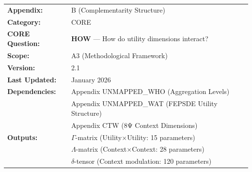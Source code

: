%
% 
%
%
%


\begin{tcolorbox}[colback=red!5!white, colframe=red!75!black, 
    title=\textbf{CORE Appendix: Complementarity Structure}]

\begin{tabular}{@{}ll@{}}
\textbf{Appendix:} & B (Complementarity Structure) \\
\textbf{Category:} & CORE \\
\textbf{CORE Question:} & \textbf{HOW} --- How do utility dimensions interact? \\
\textbf{Scope:} & A3 (Methodological Framework) \\
\textbf{Version:} & 2.1 \\
\textbf{Last Updated:} & January 2026 \\
\textbf{Dependencies:} & Appendix UNMAPPED_WHO (Aggregation Levels) \\
 & Appendix UNMAPPED_WAT (FEPSDE Utility Structure) \\
 & Appendix CTW (8Ψ Context Dimensions) \\
\textbf{Outputs:} & $\Gamma$-matrix (Utility$\times$Utility: 15 parameters) \\
 & $\Lambda$-matrix (Context$\times$Context: 28 parameters) \\
 & $\delta$-tensor (Context modulation: 120 parameters) \\
\end{tabular}

\end{tcolorbox}


